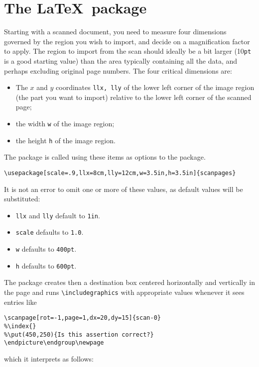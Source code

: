 \documentclass[11pt]{article}
\begin{document}
\section{The \LaTeX\ package}
Starting with a scanned document, you need to measure four dimensions governed by the region you wish to import, and decide on a magnification factor to apply. The region to import from the scan should ideally be a bit larger (10{\tt pt} is a good starting value) than the area typically containing all the data, and perhaps excluding original page numbers. The four critical dimensions are:
\begin{itemize}
\item
The $x$ and $y$ coordinates {\tt llx, lly} of the lower left corner of the image region (the part you want to  import) relative to the lower left corner of the scanned page;
\item the width {\tt w} of the image region;
\item the height {\tt h} of the image region. 
\end{itemize}
The package is called using these items as options to the package.
\begin{verbatim}
\usepackage[scale=.9,llx=8cm,lly=12cm,w=3.5in,h=3.5in]{scanpages}
\end{verbatim}
It is not an error to omit one or more of these values, as default values will be substituted:
\begin{itemize}
\item
{\tt llx} and {\tt lly} default to {\tt 1in}.
\item {\tt scale} defaults to {\tt 1.0}.
\item {\tt w} defaults to {\tt 400pt}.
\item {\tt h} defaults to {\tt 600pt}.
\end{itemize}
The package creates then a destination box centered horizontally and vertically in the page and runs \verb|\includegraphics| with  appropriate values whenever it sees entries like
\begin{verbatim}
\scanpage[rot=-1,page=1,dx=20,dy=15]{scan-0}
%\index{}
%\put(450,250){Is this assertion correct?}
\endpicture\endgroup\newpage
\end{verbatim}
which it interprets as follows:
\end{document}
